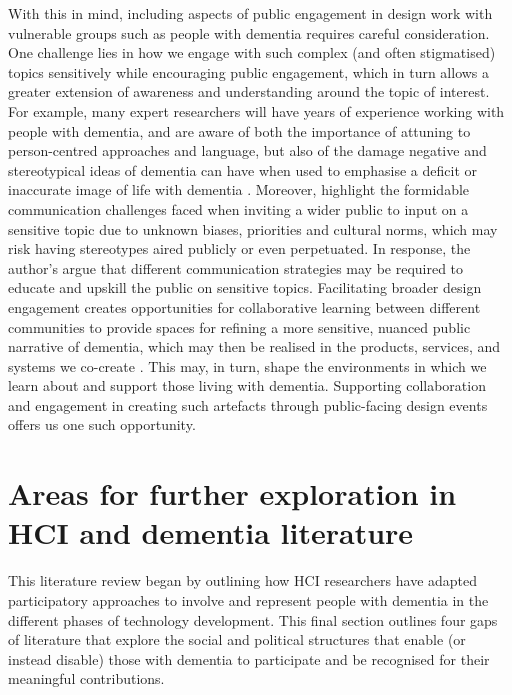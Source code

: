 With this in mind, including aspects of public engagement in design work with vulnerable groups such as people with dementia requires careful consideration. One challenge lies in how we engage with such complex (and often stigmatised) topics sensitively while encouraging public engagement, which in turn allows a greater extension of awareness and understanding around the topic of interest. For example, many expert researchers will have years of experience working with people with dementia, and are aware of both the importance of attuning to person-centred approaches \citep{fazio_fundamentals_2018} and language, but also of the damage negative and stereotypical ideas of dementia can have when used to emphasise a deficit or inaccurate image of life with dementia \citep{young_expanding_2019}. Moreover, \cite{niederdeppe2008message} highlight the formidable communication challenges faced when inviting a wider public to input on a sensitive topic due to unknown biases, priorities and cultural norms, which may risk having stereotypes aired publicly or even perpetuated. In response, the author's argue that different communication strategies may be required to educate and upskill the public on sensitive topics. Facilitating broader design engagement creates opportunities for collaborative learning between different communities to provide spaces for refining a more sensitive, nuanced public narrative of dementia, which may then be realised in the products, services, and systems we co-create \citep{costanza-chock_design_2020}. This may, in turn, shape the environments in which we learn about and support those living with dementia. Supporting collaboration and engagement in creating such artefacts through public-facing design events offers us one such opportunity. 

\section{Areas for further exploration in HCI and dementia literature}
\label{BL:Missing-gaps}
This literature review began by outlining how HCI researchers have adapted participatory approaches to involve and represent people with dementia in the different phases of technology development. This final section outlines four gaps of literature that explore the social and political structures that enable (or instead disable) those with dementia to participate and be recognised for their meaningful contributions. 

